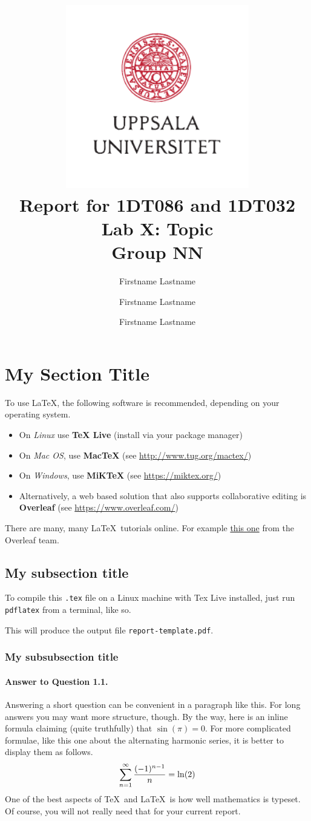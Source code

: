\documentclass[oneside,a4paper]{article}
\title{
	\includegraphics[width=0.6\textwidth]{UU_logo.pdf}\\[1em]
	Report for 1DT086 and 1DT032\\[1em]
	Lab X: Topic\\[3em]
	Group NN
}
\author{
	Firstname Lastname \and
	Firstname Lastname \and
	Firstname Lastname
}
\begin{document}
\maketitle
\thispagestyle{empty} %
\pagebreak


\section{My Section Title}

To use \LaTeX, the following software is recommended, depending on your operating system.
\begin{itemize}
	\item On {\it Linux} use {\bf TeX Live} (install via your package manager)
	\item On {\it Mac OS}, use {\bf MacTeX} (see \url{http://www.tug.org/mactex/})
	\item On {\it Windows}, use {\bf MiKTeX} (see \url{https://miktex.org/})
	\item Alternatively, a web based solution that also supports collaborative editing is {\bf Overleaf} (see \url{https://www.overleaf.com/})
\end{itemize}

There are many, many \LaTeX\ tutorials online. For example \href{https://www.overleaf.com/learn/latex/Learn_LaTeX_in_30_minutes}{this one} from the Overleaf team.

\subsection{My subsection title}

To compile this {\tt .tex} file on a Linux machine with Tex Live installed, just run {\tt pdflatex} from a terminal, like so.


This will produce the output file {\tt report-template.pdf}.

\subsubsection{My subsubsection title}

\paragraph{Answer to Question 1.1.} Answering a short question can be convenient in a paragraph like this. For long answers you may want more structure, though. By the way, here is an inline formula claiming (quite truthfully) that $\sin(\pi) = 0$. For more complicated formulae, like this one about the alternating harmonic series, it is better to display them as follows.
$$
\sum_{n=1}^\infty {(-1)^{n-1} \over n} = \ln(2)
$$
One of the best aspects of \TeX\ and \LaTeX\ is how well mathematics is typeset. Of course, you will not really need that for your current report.
\end{document}
